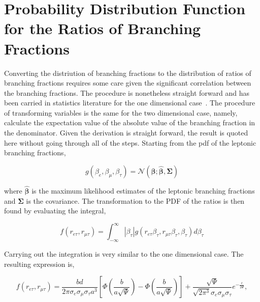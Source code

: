 \section{Probability Distribution Function for the Ratios of Branching Fractions}
\label{sec:app:ratioPdf}


Converting the distriution of branching fractions to the distribution of
ratios of branching fractions requires some care given the significant
correlation between the branching fractions.  The procedure is
nonetheless straight forward and has been carried in statistics
literature for the one dimensional case~\cite{10.1093/biomet/24.3-4.428,
10.2307/2334671}.  The procedure of transforming variables is the same
for the two dimensional case, namely, calculate the expectation value of
the absolute value of the branching fraction in the denominator.  Given
the derivation is straight forward, the result is quoted here without
going through all of the steps.  Starting from the pdf of the leptonic
branching fractions,

\begin{equation}
    g(\beta_{e}, \beta_{\mu}, \beta_{\tau}) =
    \mathcal{N}\left(\boldsymbol{\beta}; \hat{\boldsymbol{\beta}}, \boldsymbol{\Sigma}\right)
\end{equation}

\noindent where $\hat{\boldsymbol{\beta}}$ is the maximum likelihood estimates of the
leptonic branching fractions and $\boldsymbol{\Sigma}$ is the covariance.
The transformation to the PDF of the ratios is then found by evaluating
the integral,




\begin{equation}
    f(r_{e\tau}, r_{\mu\tau}) = \int_{-\infty}^{\infty}
    \left| \beta_{\tau}\right|g(r_{e\tau}\beta_{\tau}, r_{\mu\tau}\beta_{\tau}, \beta_{\tau})
    d\beta_{\tau}
\end{equation}

\noindent Carrying out the integration is very similar to the one dimensional
case.  The resulting expression is,

\begin{equation}
    f(r_{e\tau}, r_{\mu\tau}) 
    = \frac{bd}{2\pi \sigma_{e}\sigma_{\mu}\sigma_{\tau} a^{3}}
        \left[ \Phi \left(\frac{b}{a\sqrt{\Psi}}\right)
         - \Phi\left(\frac{b}{a\sqrt{\Psi}}\right)\right] 
         +
         \frac{\sqrt{\Psi}}{\sqrt{2\pi^{3}}\sigma_{e}\sigma_{\mu}\sigma_{\tau}}e^{-\frac{c}{2\Psi}},
\end{equation}

